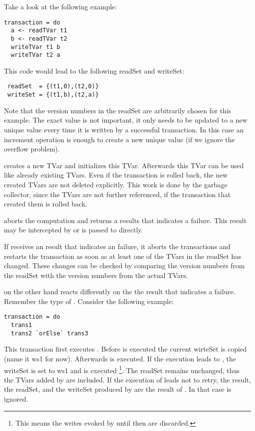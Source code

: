 Take a look at the following example:
\begin{lstlisting}
transaction = do
  a <- readTVar t1
  b <- readTVar t2
  writeTVar t1 b
  writeTVar t2 a
\end{lstlisting}
This code would lead to the following readSet and writeSet:
\begin{lstlisting}
 readSet  = {(t1,0),(t2,0)}
 writeSet = {(t1,b),(t2,a)}
\end{lstlisting}
Note that the version numbers in the readSet are arbitrarily chosen for this example. The exact value is not important, it only needs to be updated 
to a new unique value every time it is written by a successful transaction. In this case an increment operation 
is enough to create a new unique value (if we ignore the overflow problem). 

 creates a new TVar and initializes this TVar. Afterwards this TVar can be used like already existing TVars.
Even if the transaction is rolled back, the new created TVars are not deleted explicitly. This work is done by the garbage
collector, since the TVars are not further referenced, if the transaction that created them is rolled back. 

 aborts the computation and returns a results that indicates a failure. This result may be intercepted by 
 or is passed to  directly. 

If  receives an result that indicates an failure, it aborts the transactions and restarts the transaction as soon as
at least one of the TVars in the readSet has changed. These changes can be checked by comparing the version numbers from the readSet 
with the version numbers from the actual TVars.   

 on the other hand reacts differently on the the result that indicates a failure. Remember the type of 
. Consider the following example:
\begin{lstlisting}
transaction = do 
  trans1
  trans2 `orElse` trans3
\end{lstlisting}
This transaction first executes . Before  is executed the current wirteSet is copied (name it ws1 for now). Afterwards 
 is executed. If the execution leads to , the writeSet is set to ws1 and  is executed
\footnote{This means the writes evoked by  until then are discarded.}. The readSet remains unchanged, thus the TVars added
by  are included. If the execution of  leads not to retry, the result, the readSet, and the writeSet produced by 
 are the result of . In that case  is ignored. 


